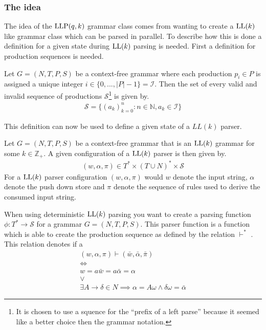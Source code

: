 \subsubsection{The idea}
The idea of the $\text{LLP}(q, k)$ grammar class comes from wanting to create a $\text{LL}(k)$ like grammar class which can be parsed in parallel. To describe how this is done a definition for a given state during $\text{LL}(k)$ parsing is needed. First a definition for production sequences is needed.

\begin{definition}
    \label{def:production-sequence}
    Let $G = (N, T, P, S)$ be a context-free grammar where each production $p_i \in P$ is assigned a unique integer $i \in \{0, ..., |P| - 1\} = \mathcal{I}$. Then the set of every valid and invalid sequence of productions $\mathcal{S}$\footnote{It is chosen to use a squence for the ``prefix of  a left parse'' \cite[5]{Vagner2007} because it seemed like a better choice then the grammar notation.} is given by.
    \begin{align*}
        \mathcal{S} = \{(a_k)_{k=0}^n : n \in \mathbb{N}, a_k \in \mathcal{I}\}
    \end{align*}
\end{definition}
\noindent This definition can now be used to define a given state of a $LL(k)$ parser. 

\begin{definition}
    \label{def:ll-configuration}
    Let $G = (N, T, P, S)$ be a context-free grammar that is an $\text{LL}(k)$ grammar for some $k \in \mathbb{Z}_+$. A given configuration \cite[p. 5]{Vagner2007} of a $\text{LL}(k)$ parser is then given by.
    \begin{align*}
        (w, \alpha, \pi) \in T^* \times (T \cup N)^* \times \mathcal{S}
    \end{align*}
    For a $\text{LL}(k)$ parser configuration $(w, \alpha, \pi)$ would $w$ denote the input string, $\alpha$ denote the push down store and $\pi$ denote the sequence of rules used to derive the consumed input string.
\end{definition}
\noindent When using deterministic $\text{LL}(k)$ parsing you want to create a parsing function $\phi: T^* \to \mathcal{S}$ for a grammar $G = (N, T, P, S)$. This parser function is a function which is able to create the production sequence as defined by the relation $\vdash^*$ \cite[6]{Vagner2007}. This relation denotes if a 
\begin{gather*}
    (w, \alpha, \pi) \vdash (\bar{w}, \bar{\alpha}, \bar{\pi}) \\
    \iff \\
    w = a\bar{w} = a\bar{\alpha} = \alpha \\
    \lor \\
    \exists A \to \delta \in N \implies  \alpha = A\omega \land \delta\omega = \bar{\alpha}
\end{gather*}

